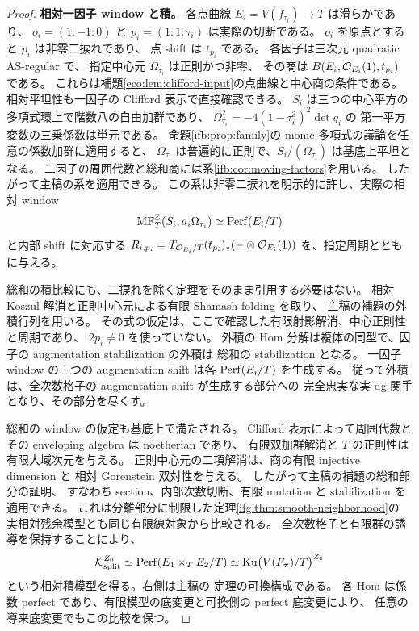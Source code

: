 \begin{proof}
\textbf{相対一因子 window と積。}
各点曲線 $E_i=V(f_{\tau_i})\to T$ は滑らかであり、
$o_i=(1:-1:0)$ と $p_i=(1:1:\tau_i)$ は実際の切断である。
$o_i$ を原点とすると $p_i$ は非零二捩れであり、
点 shift は $t_{p_i}$ である。
各因子は三次元 quadratic AS-regular で、
指定中心元 $\Omega_{\tau_i}$ は正則かつ非零、
その商は $B(E_i,\mathcal O_{E_i}(1),t_{p_i})$ である。
これらは補題\ref{eco:lem:clifford-input}の点曲線と中心商の条件である。
相対平坦性も一因子の Clifford 表示で直接確認できる。
$S_i$ は三つの中心平方の多項式環上で階数八の自由加群であり、
$\Omega_{\tau_i}^2=-4(1-\tau_i^3)^2\det q_i$ の
第一平方変数の三乗係数は単元である。
命題\ref{ifb:prop:family}の monic 多項式の議論を任意の係数加群に適用すると、
$\Omega_{\tau_i}$ は普遍的に正則で、$S_i/(\Omega_{\tau_i})$ は基底上平坦となる。
二因子の周囲代数と総和商には系\ref{ifb:cor:moving-factors}を用いる。
したがって主稿の系を適用できる。
この系は非零二捩れを明示的に許し、実際の相対 window
\[
 \operatorname{MF}_T^{\mathbb Z}(S_i,a_i\Omega_{\tau_i})\simeq\operatorname{Perf}(E_i/T)
\]
と内部 shift に対応する
$R_{i,p_i}=T_{\mathcal O_{E_i}/T}(t_{p_i})_*(-\otimes\mathcal O_{E_i}(1))$
を、指定周期とともに与える。

総和の積比較にも、二捩れを除く定理をそのまま引用する必要はない。
相対 Koszul 解消と正則中心元による有限 Shamash folding を取り、
主稿の補題の外積行列を用いる。
その式の仮定は、ここで確認した有限射影解消、中心正則性と周期であり、
$2p_i\ne0$ を使っていない。
外積の Hom 分解は複体の同型で、因子の augmentation stabilization の外積は
総和の stabilization となる。
一因子 window の三つの augmentation shift は各 $\operatorname{Perf}(E_i/T)$ を生成する。
従って外積は、全次数格子の augmentation shift が生成する部分への
完全忠実な実 dg 関手となり、その部分を尽くす。

総和の window の仮定も基底上で満たされる。
Clifford 表示によって周囲代数とその enveloping algebra は noetherian であり、
有限双加群解消と $T$ の正則性は有限大域次元を与える。
正則中心元の二項解消は、商の有限 injective dimension と
相対 Gorenstein 双対性を与える。
したがって主稿の補題の総和部分の証明、
すなわち section、内部次数切断、有限 mutation と stabilization を適用できる。
これは分離部分に制限した定理\ref{ifg:thm:smooth-neighborhood}の
実相対残余模型とも同じ有限線対象から比較される。
全次数格子と有限群の誘導を保持することにより、
\begin{equation}\label{ifv:eq:relative-products}
 \mathcal K_{\mathrm{split}}^{Z_0}
        \simeq\operatorname{Perf}(E_1\times_T E_2/T)
        \simeq\operatorname{Ku}\bigl(V(F_{\boldsymbol\tau})/T\bigr)^{Z_0}
\end{equation}
という相対積模型を得る。右側は主稿の
定理の可換構成である。
各 Hom は係数 perfect であり、有限模型の底変更と可換側の perfect 底変更により、
任意の導来底変更でもこの比較を保つ。


\end{proof}
